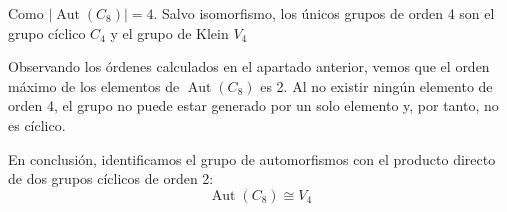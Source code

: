\documentclass[12pt]{article}
\begin{document}
\begin{ejercicio}[1 punto]
\begin{enumerate}
            Como $|\operatorname{Aut}(C_8)| = 4$. Salvo isomorfismo, los únicos grupos de orden 4 son el grupo cíclico $C_4$ y el grupo de Klein $V_4$

            Observando los órdenes calculados en el apartado anterior, vemos que el orden máximo de los elementos de $\operatorname{Aut}(C_8)$ es 2. Al no existir ningún elemento de orden 4, el grupo no puede estar generado por un solo elemento y, por tanto, no es cíclico. 
            
            En conclusión, identificamos el grupo de automorfismos con el producto directo de dos grupos cíclicos de orden 2:
            \[ \operatorname{Aut}(C_8) \cong V_4 \]
        \end{enumerate}
    \end{ejercicio}
\end{document}
